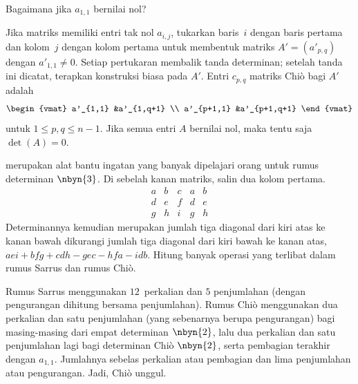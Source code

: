 \begin{exercises}
  \item Bagaimana jika $a_{1,1}$ bernilai nol?
    \begin{answer}
      Jika matriks memiliki entri tak nol $a_{i,j}$, tukarkan baris~$i$ dengan
      baris pertama dan kolom~$j$ dengan kolom pertama untuk membentuk matriks
      $A'=(a'_{p,q})$ dengan $a'_{1,1}\neq 0$.
      Setiap pertukaran membalik tanda determinan; setelah tanda ini dicatat,
      terapkan konstruksi biasa pada $A'$.
      Entri $c_{p,q}$ matriks Chi\`o bagi $A'$ adalah
      \begin{equation*}
        \begin{vmat}
          a'_{1,1}    &a'_{1,q+1} \\
          a'_{p+1,1}  &a'_{p+1,q+1}
        \end{vmat}
      \end{equation*}
      untuk $1\leq p,q\leq n-1$.
      Jika semua entri $A$ bernilai nol, maka tentu saja $\det(A)=0$.
    \end{answer}
  \item {}
    merupakan alat bantu ingatan yang banyak dipelajari orang untuk rumus
    determinan $\nbyn{3}$.
    Di sebelah kanan matriks, salin dua kolom pertama.
    \begin{equation*}
      \begin{array}{ccc|cc}
        a &b &c &a &b \\
        d &e &f &d &e \\
        g &h &i &g &h
      \end{array}
    \end{equation*}
    Determinannya kemudian merupakan jumlah tiga diagonal dari kiri atas ke
    kanan bawah dikurangi jumlah tiga diagonal dari kiri bawah ke kanan atas,
    $aei+bfg+cdh-gec-hfa-idb$.
   Hitung banyak operasi yang terlibat dalam rumus Sarrus dan rumus Chi\`o.
   \begin{answer}
     Rumus Sarrus menggunakan $12$~perkalian dan $5$ penjumlahan (dengan
     pengurangan dihitung bersama penjumlahan).
     Rumus Chi\`o menggunakan dua perkalian dan satu penjumlahan
     (yang sebenarnya berupa pengurangan) bagi masing-masing dari empat
     determinan $\nbyn{2}$, lalu dua perkalian dan satu penjumlahan lagi bagi
     determinan Chi\`o $\nbyn{2}$, serta pembagian terakhir dengan $a_{1,1}$.
     Jumlahnya sebelas perkalian atau pembagian dan lima penjumlahan atau
     pengurangan. Jadi, Chi\`o unggul.
   \end{answer}

\end{exercises}
